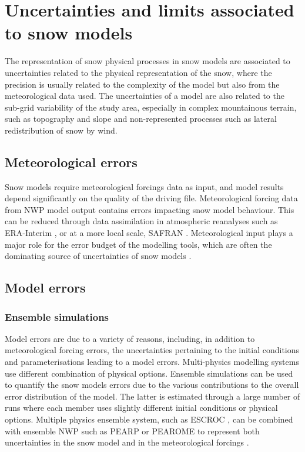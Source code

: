 \documentclass[hydrology,article,submit,moreauthors,pdftex]{Definitions/mdpi}
\begin{document}
\section{Uncertainties and limits associated to snow models} 

The representation of snow physical processes in snow models are associated to uncertainties related to the physical representation of the snow, where the precision is usually related to the complexity of the model but also from the meteorological data used. The uncertainties of a model are also related to the sub-grid variability of the study area, especially in complex mountainous terrain, such as topography and slope and non-represented processes such as lateral redistribution of snow by wind.
 

\subsection{Meteorological errors}

Snow models require meteorological forcings data as input, and model results depend significantly on the quality of the driving file.
Meteorological forcing data from NWP model output contains errors impacting snow model behaviour. This can be reduced through data assimilation in atmospheric reanalyses such as ERA-Interim \citep{Dee_2011}, or at a more local scale, SAFRAN \citep{Durand_1993}. Meteorological input plays a major role for the error budget of the modelling tools, which are often the dominating source of uncertainties of snow models \citep{Fekete_2004,Bosilovich_2008,Raleigh_2015,Essery_2013,Magnusson_2015}.



\subsection{Model errors}


\subsubsection{Ensemble simulations}

Model errors are due to a variety of reasons, including, in addition to meteorological forcing errors, the uncertainties pertaining to the initial conditions and parameterisations leading to a model errors. Multi-physics modelling systems use different combination of physical options. %
Ensemble simulations can be used to quantify the snow models errors due to the various contributions to the overall error distribution of the model. The latter is estimated through a large number of runs where each member uses slightly different initial conditions or physical options.
Multiple physics ensemble system, such as ESCROC \citep{Lafaysse_2017}, can be combined with ensemble NWP such as PEARP or PEAROME to represent both uncertainties in the snow model and in the meteorological forcings \citep{vernay2015}.
\end{document}

